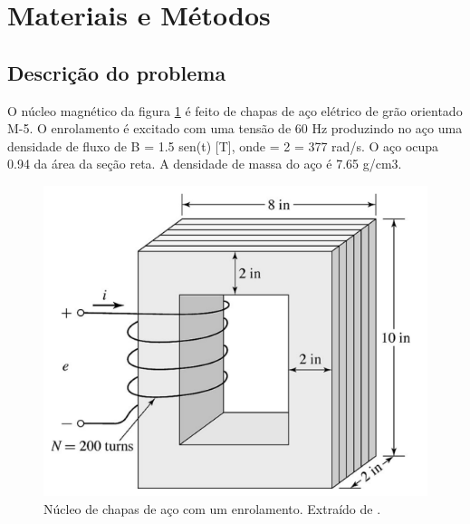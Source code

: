 
\section{Materiais e Métodos}

\subsection{Descrição do problema}
O núcleo magnético da figura \ref{circ} é feito de chapas de aço elétrico de grão orientado M-5. O enrolamento é excitado com uma tensão de 60 Hz produzindo no aço uma densidade de fluxo de B = 1.5 sen(\textomega t) [T], onde \textOmega = 2 = 377 rad/s. O aço ocupa 0.94 da área da seção reta. A densidade de massa do aço é 7.65 g/cm3. %
\begin{figure}[h]
\centering
\includegraphics[scale=0.6]{img/ex1_8.png}
\caption[Núcleo de chapas de aço com um enrolamento]{Núcleo de chapas de aço com um enrolamento. Extraído de \cite{Fitzgerald2008}.}
\label{circ}
\end{figure}

